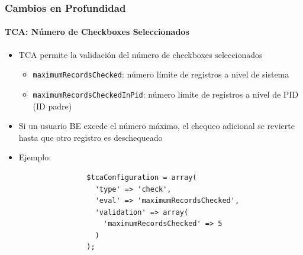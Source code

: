 \begin{frame}[fragile]
	\frametitle{Cambios en Profundidad}
	\framesubtitle{TCA: Número de Checkboxes Seleccionados}

	\lstset{
		basicstyle=\tiny\ttfamily
	}

	\begin{itemize}
		\item TCA permite la validación del número de checkboxes seleccionados

			\begin{itemize}
				\item \texttt{maximumRecordsChecked}:\newline
					número límite de registros a nivel de sistema
				\item \texttt{maximumRecordsCheckedInPid}:\newline
					número límite de registros a nivel de PID (ID padre)
			\end{itemize}

		\item Si un usuario BE excede el número máximo, el chequeo adicional se revierte hasta que otro registro es deschequeado

		\item Ejemplo:

			\begin{lstlisting}
				$tcaConfiguration = array(
				  'type' => 'check',
				  'eval' => 'maximumRecordsChecked',
				  'validation' => array(
				    'maximumRecordsChecked' => 5
				  )
				);
			\end{lstlisting}

	\end{itemize}

\end{frame}


